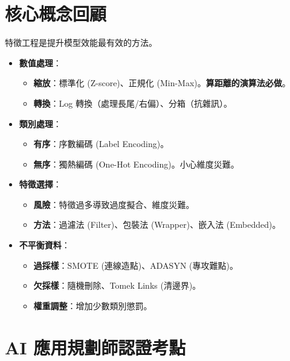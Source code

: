 \documentclass[
  letterpaper,
  DIV=11,
  numbers=noendperiod]{scrreprt}
\providecommand{\tightlist}{%
  \setlength{\itemsep}{0pt}\setlength{\parskip}{0pt}}
\begin{document}
\section{核心概念回顧}\label{ux6838ux5fc3ux6982ux5ff5ux56deux9867-3}

特徵工程是提升模型效能最有效的方法。

\begin{itemize}
\tightlist
\item
  \textbf{數值處理}：

  \begin{itemize}
  \tightlist
  \item
    \textbf{縮放}：標準化 (Z-score)、正規化
    (Min-Max)。\textbf{算距離的演算法必做}。
  \item
    \textbf{轉換}：Log 轉換（處理長尾/右偏）、分箱（抗雜訊）。
  \end{itemize}
\item
  \textbf{類別處理}：

  \begin{itemize}
  \tightlist
  \item
    \textbf{有序}：序數編碼 (Label Encoding)。
  \item
    \textbf{無序}：獨熱編碼 (One-Hot Encoding)。小心維度災難。
  \end{itemize}
\item
  \textbf{特徵選擇}：

  \begin{itemize}
  \tightlist
  \item
    \textbf{風險}：特徵過多導致過度擬合、維度災難。
  \item
    \textbf{方法}：過濾法 (Filter)、包裝法 (Wrapper)、嵌入法
    (Embedded)。
  \end{itemize}
\item
  \textbf{不平衡資料}：

  \begin{itemize}
  \tightlist
  \item
    \textbf{過採樣}：SMOTE (連線造點)、ADASYN (專攻難點)。
  \item
    \textbf{欠採樣}：隨機刪除、Tomek Links (清邊界)。
  \item
    \textbf{權重調整}：增加少數類別懲罰。
  \end{itemize}
\end{itemize}

\section{AI
應用規劃師認證考點}\label{ai-ux61c9ux7528ux898fux5283ux5e2bux8a8dux8b49ux8003ux9ede-3}
\end{document}
